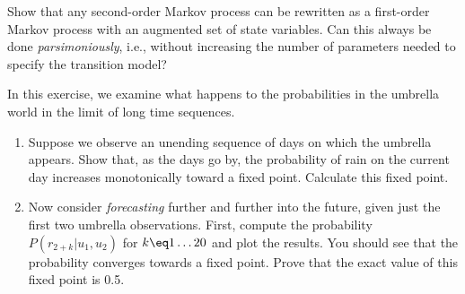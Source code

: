 
\begin{exercise}
Show that any second-order Markov process can be rewritten as a
first-order Markov process with an augmented set of state
variables. Can this always be done {\em parsimoniously}, i.e.,
without increasing the number of parameters needed to specify the
transition model?%
\end{exercise}%

\begin{exercise}
In this exercise, we examine what happens to the probabilities in the
umbrella world in the limit of long time sequences.
\begin{enumerate}
\item Suppose we observe an unending sequence of days on which the
umbrella appears. Show that, as the days go by, the probability of
rain on the current day increases monotonically toward a fixed
point. Calculate this fixed point.
\item Now consider {\em forecasting} further and further into the
future, given just the first two umbrella observations.
First, compute the probability \(P(r_{2+k}|u_1,u_2)\) for \(k\eq
1\ldots {20}\) and plot the results. You should see that the
probability converges towards a fixed point. Prove that the exact value of this
fixed point is 0.5.
\end{enumerate}
\end{exercise} 

